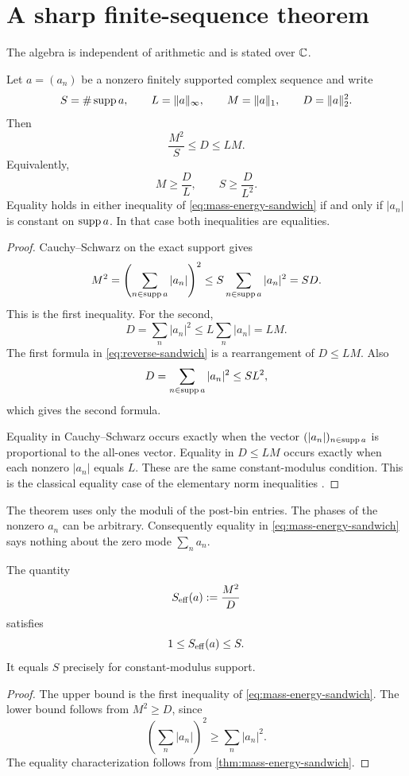 \section{A sharp finite-sequence theorem}
\label{sec:finite-sequence}

The algebra is independent of arithmetic and is stated over
\(\mathbb C\).

\begin{theorem}
\label{thm:mass-energy-sandwich}
Let \(a=(a_n)\) be a nonzero finitely supported complex sequence and
write
\[
 S=\#\operatorname{supp} a,\qquad
 L=\|a\|_\infty,\qquad
 M=\|a\|_1,\qquad
 D=\|a\|_2^2.
\]
Then
\begin{equation}
\boxed{
 \frac{M^2}{S}\le D\le LM.}
\label{eq:mass-energy-sandwich}
\end{equation}
Equivalently,
\begin{equation}
 M\ge\frac{D}{L},
 \qquad
 S\ge\frac{D}{L^2}.
\label{eq:reverse-sandwich}
\end{equation}
Equality holds in either inequality of
\eqref{eq:mass-energy-sandwich} if and only if
\(|a_n|\) is constant on \(\operatorname{supp} a\).  In that case both
inequalities are equalities.
\end{theorem}

\begin{proof}
Cauchy--Schwarz on the exact support gives
\[
 M^2
 =\left(\sum_{n\in\operatorname{supp} a}|a_n|\right)^2
 \le
 S\sum_{n\in\operatorname{supp} a}|a_n|^2
 =SD.
\]
This is the first inequality.  For the second,
\[
 D=\sum_n|a_n|^2
 \le L\sum_n|a_n|
 =LM.
\]
The first formula in \eqref{eq:reverse-sandwich} is a rearrangement
of \(D\le LM\).  Also
\[
 D=\sum_{n\in\operatorname{supp} a}|a_n|^2\le SL^2,
\]
which gives the second formula.

Equality in Cauchy--Schwarz occurs exactly when the vector
\((|a_n|)_{n\in\operatorname{supp} a}\) is proportional to the all-ones vector.
Equality in \(D\le LM\) occurs exactly when each nonzero
\(|a_n|\) equals \(L\).  These are the same constant-modulus
condition.  This is the classical equality case of the elementary
norm inequalities \citep{HardyLittlewoodPolya1952}.
\end{proof}

\begin{remark}
The theorem uses only the moduli of the post-bin entries.  The phases
of the nonzero \(a_n\) can be arbitrary.  Consequently equality in
\eqref{eq:mass-energy-sandwich} says nothing about the zero mode
\(\sum_na_n\).
\end{remark}

\begin{corollary}
\label{cor:effective-support}
The quantity
\[
 S_{\rm eff}(a):=\frac{M^2}{D}
\]
satisfies
\[
 1\le S_{\rm eff}(a)\le S.
\]
It equals \(S\) precisely for constant-modulus support.
\end{corollary}

\begin{proof}
The upper bound is the first inequality of
\eqref{eq:mass-energy-sandwich}.  The lower bound follows from
\(M^2\ge D\), since
\[
 \left(\sum_n|a_n|\right)^2
 \ge\sum_n|a_n|^2.
\]
The equality characterization follows from
\cref{thm:mass-energy-sandwich}.
\end{proof}
